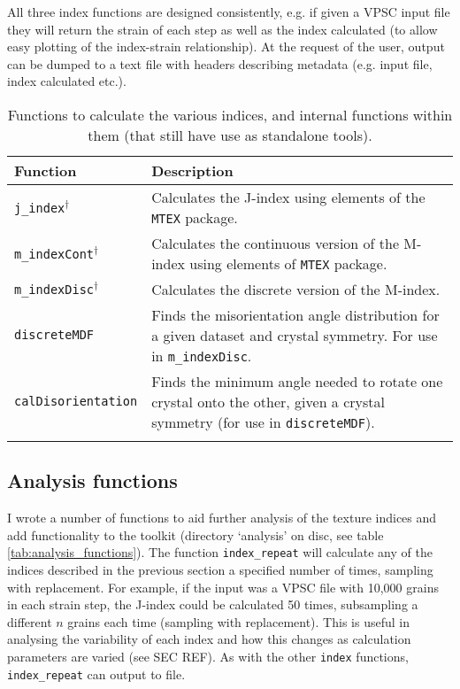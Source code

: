 \documentclass[a4paper,12pt]{report}
\numberwithin{equation}{chapter}
\begin{document}
All three index functions are designed consistently, e.g. if given a VPSC input file they will return the strain of each step as well as the index calculated (to allow easy plotting of the index-strain relationship). At the request of the user, output can be dumped to a text file with headers describing metadata (e.g. input file, index calculated etc.).                                                                                                                    

\begin{table}[h!] 
	\centering
	\caption[Functions: index calculation]{Functions to calculate the various indices, and internal functions within them (that still have use as standalone tools).}
	\noindent
	
\begin{tabularx}{\textwidth}{lX}

\hline
\hline
Function    & Description   \\ 
\hline
\hline
\texttt{j\_{}index}$^{\dagger}$ & Calculates the J-index using elements of the \texttt{MTEX} package. \\ 

\texttt{m\_{}indexCont}$^{\dagger}$ & Calculates the continuous version of the M-index using elements of \texttt{MTEX} package. \\

\texttt{m\_{}indexDisc}$^{\dagger}$ & Calculates the discrete version of the M-index. \\

\texttt{discreteMDF} & Finds the misorientation angle distribution for a given dataset and crystal symmetry. For use in \texttt{m\_{}indexDisc}. \\

\texttt{calDisorientation} & Finds the minimum angle needed to rotate one crystal onto the other, given a crystal symmetry (for use in \texttt{discreteMDF}). \\
\\
\hline
\hline

\end{tabularx}
\label{tab:index_functions}
\end{table}

\subsection{Analysis functions}

I wrote a number of functions to aid further analysis of the texture indices and add functionality to the toolkit (directory \lq{}analysis\rq{} on disc, see table \ref{tab:analysis_functions}). The function \texttt{index\_{}repeat} will calculate any of the indices described in the previous section a specified number of times, sampling with replacement. For example, if the input was a VPSC file with 10,000 grains in each strain step, the J-index could be calculated 50 times, subsampling a different $n$ grains each time (sampling with replacement). This is useful in analysing the variability of each index and how this changes as calculation parameters are varied (see SEC REF).  As with the other \texttt{index} functions, \texttt{index\_{}repeat} can output to file.
\end{document}
